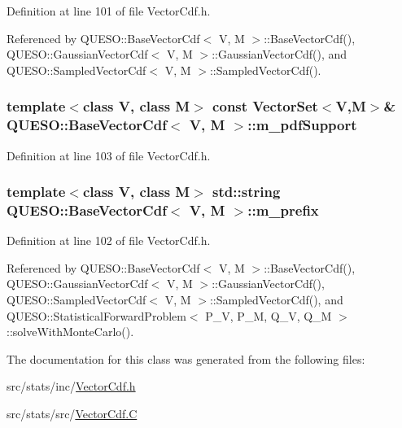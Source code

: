 Definition at line 101 of file Vector\-Cdf.\-h.



Referenced by Q\-U\-E\-S\-O\-::\-Base\-Vector\-Cdf$<$ V, M $>$\-::\-Base\-Vector\-Cdf(), Q\-U\-E\-S\-O\-::\-Gaussian\-Vector\-Cdf$<$ V, M $>$\-::\-Gaussian\-Vector\-Cdf(), and Q\-U\-E\-S\-O\-::\-Sampled\-Vector\-Cdf$<$ V, M $>$\-::\-Sampled\-Vector\-Cdf().

\hypertarget{class_q_u_e_s_o_1_1_base_vector_cdf_a4e083383c98725fa83c5c8c133dcfea4}{
\subsubsection[{m\-\_\-pdf\-Support}]{\setlength{\rightskip}{0pt plus 5cm}template$<$class V, class M$>$ const {\bf Vector\-Set}$<$V,M$>$\& {\bf Q\-U\-E\-S\-O\-::\-Base\-Vector\-Cdf}$<$ V, M $>$\-::m\-\_\-pdf\-Support\hspace{0.3cm}{\ttfamily [protected]}}}\label{class_q_u_e_s_o_1_1_base_vector_cdf_a4e083383c98725fa83c5c8c133dcfea4}


Definition at line 103 of file Vector\-Cdf.\-h.

\hypertarget{class_q_u_e_s_o_1_1_base_vector_cdf_ac88b657f25153ab6c03bd65b64cada52}{
\subsubsection[{m\-\_\-prefix}]{\setlength{\rightskip}{0pt plus 5cm}template$<$class V, class M$>$ std\-::string {\bf Q\-U\-E\-S\-O\-::\-Base\-Vector\-Cdf}$<$ V, M $>$\-::m\-\_\-prefix\hspace{0.3cm}{\ttfamily [protected]}}}\label{class_q_u_e_s_o_1_1_base_vector_cdf_ac88b657f25153ab6c03bd65b64cada52}


Definition at line 102 of file Vector\-Cdf.\-h.



Referenced by Q\-U\-E\-S\-O\-::\-Base\-Vector\-Cdf$<$ V, M $>$\-::\-Base\-Vector\-Cdf(), Q\-U\-E\-S\-O\-::\-Gaussian\-Vector\-Cdf$<$ V, M $>$\-::\-Gaussian\-Vector\-Cdf(), Q\-U\-E\-S\-O\-::\-Sampled\-Vector\-Cdf$<$ V, M $>$\-::\-Sampled\-Vector\-Cdf(), and Q\-U\-E\-S\-O\-::\-Statistical\-Forward\-Problem$<$ P\-\_\-\-V, P\-\_\-\-M, Q\-\_\-\-V, Q\-\_\-\-M $>$\-::solve\-With\-Monte\-Carlo().



The documentation for this class was generated from the following files\-:\begin{DoxyCompactItemize}
\item 
src/stats/inc/\hyperlink{_vector_cdf_8h}{Vector\-Cdf.\-h}\item 
src/stats/src/\hyperlink{_vector_cdf_8_c}{Vector\-Cdf.\-C}\end{DoxyCompactItemize}
